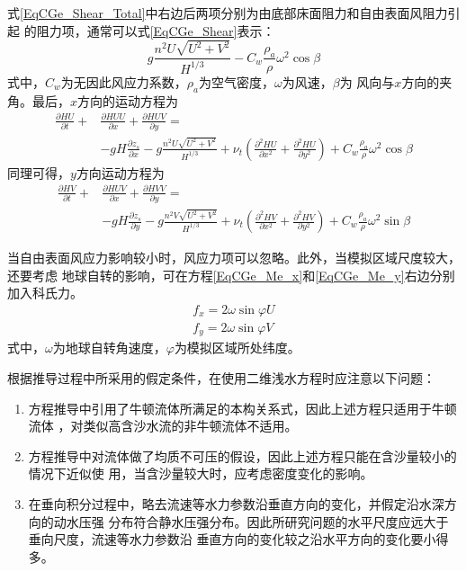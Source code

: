 式\eqref{EqCGe_Shear_Total}中右边后两项分别为由底部床面阻力和自由表面风阻力引起
的阻力项，通常可以式\eqref{EqCGe_Shear}表示：
\begin{equation}
  g\frac{n^{2}U\sqrt{U^{2}+V^{2}}}{H^{1/3}}
  -
  C_{w}\frac{\rho_{a}}{\rho}\omega^{2}\cos\beta
  \label{EqCGe_Shear}
\end{equation}
式中，$C_{w}$为无因此风应力系数，$\rho_{a}$为空气密度，$\omega$为风速，$\beta$为
风向与$x$方向的夹角。最后，$x$方向的运动方程为
\begin{equation}
  \begin{aligned}
    \frac{\partial HU}{\partial t} +
    &\frac{\partial HUU}{\partial x} +
    \frac{\partial HUV}{\partial y}
    =\\
    &-gH\frac{\partial  z_{s}}{\partial x}
    -g\frac{n^{2}U\sqrt{U^{2}+V^{2}}}{H^{1/3}}
    +
    \nu_{t}\left(
    \frac{\partial^{2}HU}{\partial x^{2}}+
    \frac{\partial^{2}HU}{\partial y^{2}}
    \right)
    +C_{w}\frac{\rho_{a}}{\rho}\omega^{2}\cos\beta
  \end{aligned}
  \label{EqCGe_Me_x}
\end{equation}
同理可得，$y$方向运动方程为
\begin{equation}
  \begin{aligned}
    \frac{\partial HV}{\partial t} +
    &\frac{\partial HUV}{\partial x} +
    \frac{\partial HVV}{\partial y}
    =\\
    &-gH\frac{\partial  z_{s}}{\partial y}
    -g\frac{n^{2}V\sqrt{U^{2}+V^{2}}}{H^{1/3}}
    +
    \nu_{t}\left(
    \frac{\partial^{2}HV}{\partial x^{2}}+
    \frac{\partial^{2}HV}{\partial y^{2}}
    \right)
    +C_{w}\frac{\rho_{a}}{\rho}\omega^{2}\sin\beta
  \end{aligned}
  \label{EqCGe_Me_y}
\end{equation}

当自由表面风应力影响较小时，风应力项可以忽略。此外，当模拟区域尺度较大，还要考虑
地球自转的影响，可在方程\eqref{EqCGe_Me_x}和\eqref{EqCGe_Me_y}右边分别加入科氏力。
\begin{equation}
  \begin{aligned}
    f_x = 2\omega\sin\varphi U
    \\
    f_y = 2\omega\sin\varphi V
  \end{aligned}
\end{equation}
式中，$\omega$为地球自转角速度，$\varphi$为模拟区域所处纬度。

根据推导过程中所采用的假定条件，在使用二维浅水方程时应注意以下问题：
\begin{enumerate}
  \item 方程推导中引用了牛顿流体所满足的本构关系式，因此上述方程只适用于牛顿流体
    ，对类似高含沙水流的非牛顿流体不适用。
  \item 方程推导中对流体做了均质不可压的假设，因此上述方程只能在含沙量较小的情况下近似使
    用，当含沙量较大时，应考虑密度变化的影响。
  \item 在垂向积分过程中，略去流速等水力参数沿垂直方向的变化，并假定沿水深方向的动水压强
    分布符合静水压强分布。因此所研究问题的水平尺度应远大于垂向尺度，流速等水力参数沿
    垂直方向的变化较之沿水平方向的变化要小得多。
\end{enumerate}

